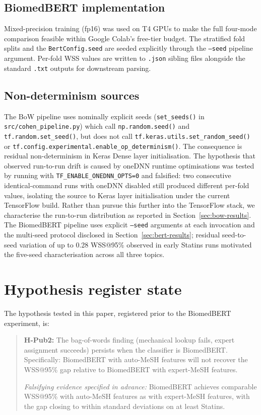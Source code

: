 \documentclass{article}
\begin{document}
\subsection{BiomedBERT implementation}

Mixed-precision training (fp16) was used on T4 GPUs to make the full four-mode comparison feasible within Google Colab's free-tier budget. The stratified fold splits and the \texttt{BertConfig.seed} are seeded explicitly through the \texttt{--seed} pipeline argument. Per-fold WSS values are written to \texttt{.json} sibling files alongside the standard \texttt{.txt} outputs for downstream parsing.

\subsection{Non-determinism sources}

The BoW pipeline uses nominally explicit seeds (\texttt{set\_seeds()} in \texttt{src/cohen\_pipeline.py}) which call \texttt{np.random.seed()} and \texttt{tf.random.set\_seed()}, but does not call \texttt{tf.keras.utils.set\_random\_seed()} or \texttt{tf.config.experimental.enable\_op\_determinism()}. The consequence is residual non-determinism in Keras Dense layer initialisation. The hypothesis that observed run-to-run drift is caused by oneDNN runtime optimisations was tested by running with \texttt{TF\_ENABLE\_ONEDNN\_OPTS=0} and falsified: two consecutive identical-command runs with oneDNN disabled still produced different per-fold values, isolating the source to Keras layer initialisation under the current TensorFlow build. Rather than pursue this further into the TensorFlow stack, we characterise the run-to-run distribution as reported in Section~\ref{sec:bow-results}. The BiomedBERT pipeline uses explicit \texttt{--seed} arguments at each invocation and the multi-seed protocol disclosed in Section~\ref{sec:bert-results}; residual seed-to-seed variation of up to 0.28 WSS@95\% observed in early Statins runs motivated the five-seed characterisation across all three topics.

\newpage
\section{Hypothesis register state}

The hypothesis tested in this paper, registered prior to the BiomedBERT experiment, is:

\begin{quote}
\textbf{H-Pub2:} The bag-of-words finding (mechanical lookup fails, expert assignment succeeds) persists when the classifier is BiomedBERT. Specifically: BiomedBERT with auto-MeSH features will not recover the WSS@95\% gap relative to BiomedBERT with expert-MeSH features.

\textit{Falsifying evidence specified in advance:} BiomedBERT achieves comparable WSS@95\% with auto-MeSH features as with expert-MeSH features, with the gap closing to within standard deviations on at least Statins.
\end{quote}
\end{document}
